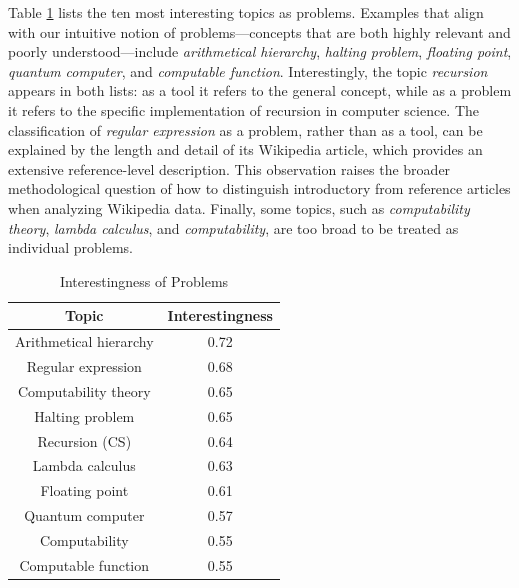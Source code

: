 Table \ref{tab:Interestingness-of-Problems} lists the ten most interesting topics as problems. Examples that align with our intuitive notion of problems—concepts that are both highly relevant and poorly understood—include \emph{arithmetical hierarchy}, \emph{halting problem}, \emph{floating point}, \emph{quantum computer}, and \emph{computable function}. Interestingly, the topic \emph{recursion} appears in both lists: as a tool it refers to the general concept, while as a problem it refers to the specific implementation of recursion in computer science. The classification of \emph{regular expression} as a problem, rather than as a tool, can be explained by the length and detail of its Wikipedia article, which provides an extensive reference-level description. This observation raises the broader methodological question of how to distinguish introductory from reference articles when analyzing Wikipedia data. Finally, some topics, such as \emph{computability theory}, \emph{lambda calculus}, and \emph{computability}, are too broad to be treated as individual problems.

\begin{table}
\begin{centering}
\begin{tabular}{|c|c|}
\hline 
Topic & Interestingness\tabularnewline
\hline 
\hline 
Arithmetical hierarchy & 0.72\tabularnewline
\hline 
Regular expression & 0.68\tabularnewline
\hline 
Computability theory & 0.65\tabularnewline
\hline 
Halting problem & 0.65\tabularnewline
\hline 
Recursion (CS) & 0.64\tabularnewline
\hline 
Lambda calculus & 0.63\tabularnewline
\hline 
Floating point & 0.61\tabularnewline
\hline 
Quantum computer & 0.57\tabularnewline
\hline 
Computability & 0.55\tabularnewline
\hline 
Computable function & 0.55\tabularnewline
\hline 
\end{tabular}
\par\end{centering}

\caption{\label{tab:Interestingness-of-Problems}Interestingness of Problems}
\end{table}




